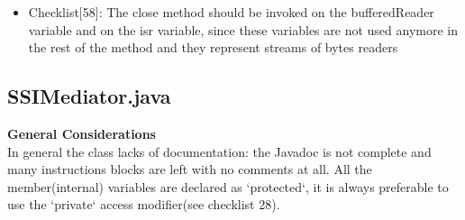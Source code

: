 \documentclass[11pt,titlepage]{article} %
\begin{document}
\begin{itemize}
\begin{itemize}
     \item Checklist[58]:
      The close method should be invoked on the bufferedReader variable and on the
      isr variable, since these variables are not used anymore in the rest of the method
      and they represent streams of bytes readers
      

    \end{itemize}

  \end{itemize}


\subsection{SSIMediator.java}
  \textbf{General Considerations} \hfill \\
  In general the class lacks of documentation: the Javadoc is not complete and many instructions blocks are left with no comments at all.\newline
  All the member(internal) variables are declared as `protected`, it is always preferable to use the `private` access modifier(see checklist 28).
\end{document}
